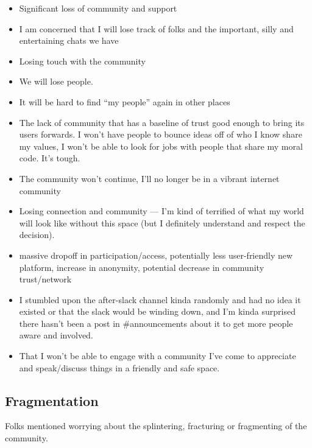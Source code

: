 \documentclass[
]{book}
\providecommand{\tightlist}{%
  \setlength{\itemsep}{0pt}\setlength{\parskip}{0pt}}
\begin{document}
\begin{itemize}
\tightlist
\item
  Significant loss of community and support
\item
  I am concerned that I will lose track of folks and the important, silly and entertaining chats we have
\item
  Losing touch with the community
\item
  We will lose people.
\item
  It will be hard to find ``my people'' again in other places
\item
  The lack of community that has a baseline of trust good enough to bring its users forwards. I won't have people to bounce ideas off of who I know share my values, I won't be able to look for jobs with people that share my moral code. It's tough.
\item
  The community won't continue, I'll no longer be in a vibrant internet community
\item
  Losing connection and community --- I'm kind of terrified of what my world will look like without this space (but I definitely understand and respect the decision).
\item
  massive dropoff in participation/access, potentially less user-friendly new platform, increase in anonymity, potential decrease in community trust/network
\item
  I stumbled upon the after-slack channel kinda randomly and had no idea it existed or that the slack would be winding down, and I'm kinda surprised there hasn't been a post in \#announcements about it to get more people aware and involved.
\item
  That I won't be able to engage with a community I've come to appreciate and speak/discuss things in a friendly and safe space.
\end{itemize}

\subsection{Fragmentation}\label{fragmentation}

Folks mentioned worrying about the splintering, fracturing or fragmenting of the community.
\end{document}
